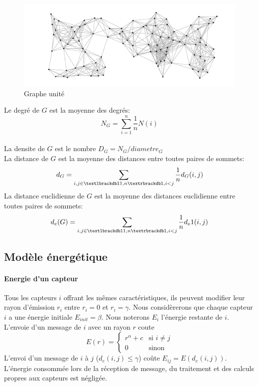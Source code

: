\begin{figure}[H]
\centering
\includegraphics[scale=0.5]{Etat_de_l'art/source/graph1.png}
\caption{Graphe unité}
\end{figure} 



\begin{mydef}
 
 Le degré de $G$ est la moyenne des degrés:$$N_G=\sum_{i=1}^n{\frac1n N(i)}$$\\
 La densite de $G$ est le nombre $D_G=N_G/diametre_G$\\
 La distance de $G$ est la moyenne des distances entre toutes paires de sommets:$$d_G=\sum_{i,j\in \textlbrackdbl 1,n \textrbrackdbl,i<j}{\frac1n d_G(i,j)}$$
 La distance euclidienne de $G$ est la moyenne des distances euclidienne entre toutes paires de sommets:$$d_e(G)=\sum_{i,j\in \textlbrackdbl 1,n \textrbrackdbl,i<j}{\frac1n d_e1(i,j)}$$

\end{mydef}

\subsection{Modèle énergétique}
\paragraph{Energie d'un capteur}
Tous les capteurs $i$ offrant les mêmes caractéristiques, ils peuvent modifier leur rayon d'émission $r_i$ entre $r_i=0$ et $r_i=\gamma$.
Nous considèrerons que chaque capteur $i$ a une énergie initiale $E_{init}=\beta$.
Nous noterons $E_i$ l'énergie restante de $i$.
L'envoie d'un message de $i$ avec un rayon $r$ coute $$ E(r)= \begin{cases} r^\alpha + c & \text{si }i\neq j \\ 0 & \text{sinon}  \end{cases}$$
L'envoi d'un message de $i$ à $j$ ($d_e(i,j)\leq \gamma$) coûte  $ E_{ij}=E(d_e(i,j))$.
L'énergie consommée lors de la réception de message, du traitement et des calculs propres aux capteurs est négligée.


